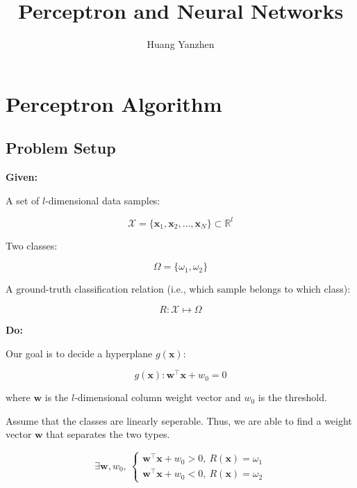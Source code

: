 \documentclass{article}
\title{Perceptron and Neural Networks}
\author{Huang Yanzhen}
\begin{document}
\maketitle
\section{Perceptron Algorithm}
\subsection{Problem Setup}\label{ssection:problem-setup}

\textbf{Given:}

A set of $l$-dimensional data samples:

\begin{equation}
    \mathcal{X} = \{\mathbf{x}_{1}, \mathbf{x}_2, \ldots, \mathbf{x}_{N}\} \subset \mathbb{R}^{l}
\end{equation}

Two classes:

\begin{equation}
    \Omega = \{\omega_{1}, \omega_{2}\}
\end{equation}

A ground-truth classification relation (i.e., which sample belongs to which class):

\begin{equation}
    R: \mathcal{X} \mapsto \Omega
\end{equation}

\textbf{Do:}

Our goal is to decide a hyperplane $g(\mathbf{x})$:

\begin{equation}
    g(\mathbf{x}): \mathbf{w}^\top \mathbf{x} + w_{0} = 0
\end{equation}

where $\mathbf{w}$ is the $l$-dimensional column weight vector and $w_{0}$ 
is the threshold. 

Assume that the classes are linearly seperable. Thus, we 
are able to find a weight vector $\mathbf{w}$ that separates the two types.

\begin{equation}
    \exists \mathbf{w}, w_{0}, \ 
    \begin{cases}
        \mathbf{w}^\top \mathbf{x} + w_{0} > 0, \ R(\mathbf{x}) = \omega_{1} \\
        \mathbf{w}^\top \mathbf{x} + w_{0} < 0, \ R(\mathbf{x}) = \omega_{2}
    \end{cases}
\end{equation}
\end{document}
